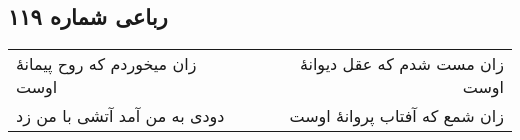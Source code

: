 \begin{center}
\section*{رباعی شماره ۱۱۹}
\label{sec:sh119}
\begin{longtable}{l p{0.5cm} r}
زان میخوردم که روح پیمانهٔ اوست
&&
زان مست شدم که عقل دیوانهٔ اوست
\\
دودی به من آمد آتشی با من زد
&&
زان شمع که آفتاب پروانهٔ اوست
\\
\end{longtable}
\end{center}

